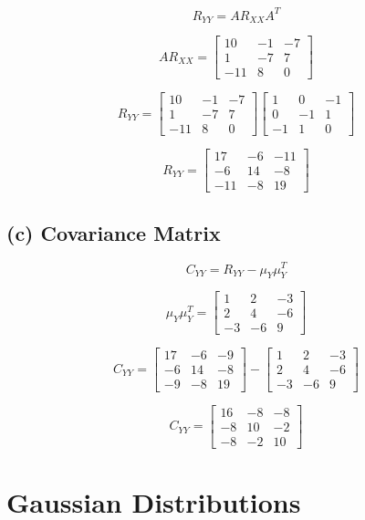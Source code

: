 \documentclass[12pt]{article}
\begin{document}
\[
R_{YY} = A R_{XX} A^T
\]

\[
AR_{XX} =
\begin{bmatrix}
10 & -1 & -7 \\
1 & -7 & 7 \\
-11 & 8 & 0
\end{bmatrix}
\]

\[
R_{YY} =
\begin{bmatrix}
10 & -1 & -7 \\
1 & -7 & 7 \\
-11 & 8 & 0
\end{bmatrix}
\begin{bmatrix}
1 & 0 & -1 \\
0 & -1 & 1 \\
-1 & 1 & 0
\end{bmatrix}
\]

\[
R_{YY} =
\begin{bmatrix}
17 & -6 & -11 \\
-6 & 14 & -8 \\
-11 & -8 & 19
\end{bmatrix}
\]

\subsection{(c) Covariance Matrix}

\[
C_{YY} = R_{YY} - \mu_Y \mu_Y^T
\]

\[
\mu_Y \mu_Y^T =
\begin{bmatrix}
1 & 2 & -3 \\
2 & 4 & -6 \\
-3 & -6 & 9
\end{bmatrix}
\]

\[
C_{YY} =
\begin{bmatrix}
17 & -6 & -9 \\
-6 & 14 & -8 \\
-9 & -8 & 19
\end{bmatrix}
-
\begin{bmatrix}
1 & 2 & -3 \\
2 & 4 & -6 \\
-3 & -6 & 9
\end{bmatrix}
\]

\[
C_{YY} =
\begin{bmatrix}
16 & -8 & -8 \\
-8 & 10 & -2 \\
-8 & -2 & 10
\end{bmatrix}
\]

\section{Gaussian Distributions}
\end{document}
